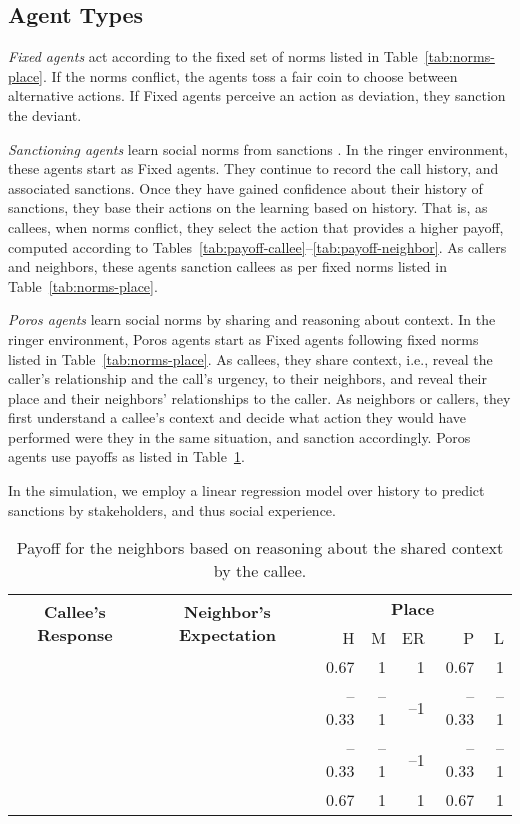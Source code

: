 \documentclass[11pt,          %
               phd,           %
               onehalfspacing %
               ]{ncsuthesis}
\newcommand{\cmark}{\ding{51}\xspace}%
\newcommand{\xmark}{\ding{55}\xspace}%
\newcommand{\fbf}{\textbf}
\newcommand{\frameworkB}{Poros\xspace}
\begin{document}
\subsection{Agent Types}
\label{sec:agent-types}

\emph{Fixed agents} act according to the fixed set of norms listed in
Table~\ref{tab:norms-place}. If the norms conflict, the agents toss a
fair coin to choose between alternative actions. If Fixed agents
perceive an action as deviation, they sanction the deviant.

\emph{Sanctioning agents} learn social norms from sanctions
\citep{Andrighetto-2013-PunishVoice}. In the ringer environment, these
agents start as Fixed agents. They continue to record the call history,
and associated sanctions. Once they have gained confidence about their
history of sanctions, they base their actions on the learning based on
history. That is, as callees, when norms conflict, they select the
action that provides a higher payoff, computed according to
Tables~\ref{tab:payoff-callee}--\ref{tab:payoff-neighbor}. As callers
and neighbors, these agents sanction callees as per fixed norms listed
in Table~\ref{tab:norms-place}.

\emph{\frameworkB agents} learn social norms by sharing and reasoning
about context. In the ringer environment, \frameworkB agents start as Fixed
agents following fixed norms listed in Table~\ref{tab:norms-place}. As
callees, they share context, i.e., reveal the caller's relationship and
the call's urgency, to their neighbors, and reveal their place and their
neighbors' relationships to the caller. As neighbors or callers, they
first understand a callee's context and decide what action they would
have performed were they in the same situation, and sanction
accordingly. \frameworkB agents use payoffs as listed in
Table~\ref{tab:payoff-neighbor-reason}.

In the simulation, we employ a linear regression model over history to
predict sanctions by stakeholders, and thus social experience.

\begin{table}[!htb]
\centering
\caption[Payoffs based on reasoning about the shared context.]{Payoff for the neighbors based on reasoning about the shared context by the callee.}
\label{tab:payoff-neighbor-reason}
\begin{tabular}{ccrrrrr}
\toprule
\multirow{2}{2.5cm}{\fbf{Callee's Response}}&\multirow{2}{2.8cm}{\fbf{Neighbor's Expectation}}&\multicolumn{5}{c}{\fbf{Place}}\\
\cmidrule{3-7}
&&H&M&ER&P&L\\\midrule
\cmark&\cmark &0.67 &1 &1 &0.67&1\\
\cmark&\xmark &--0.33 &--1 &--1 &--0.33&--1\\
\xmark&\cmark &--0.33 &--1 &--1 &--0.33&--1\\
\xmark&\xmark &0.67&1&1 &0.67&1\\\bottomrule
\end{tabular}
\end{table}
\end{document}
